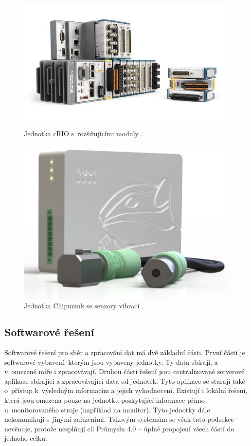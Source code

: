 \begin{figure}[h]
  \centering
  \begin{minipage}[b]{0.45\textwidth}
    \includegraphics[width=\textwidth]{obrazky-figures/rio.jpg}
    \caption{Jednotka cRIO s~rozšiřujícími moduly \cite{rio}.}
    \label{pic:rio}
  \end{minipage}
  \hfill
  \begin{minipage}[b]{0.45\textwidth}
    \includegraphics[width=\textwidth]{obrazky-figures/chipmunk.jpg}
    \caption{Jednotka Chipmunk se senzory vibrací \cite{4dotchipmunk}.}
    \label{pic:4dotchip}
  \end{minipage}
\end{figure}


\subsection{Softwarové řešení}
Softwarové řešení pro sběr a zpracování dat má dvě základní části. První částí je softwarové vybavení, kterým jsou vybaveny jednotky. Ty data sbírají, a v~omezené míře i zpracovávají. Druhou částí řešení jsou centralizované serverové aplikace sbírající a zpracovávající data od jednotek. Tyto aplikace se starají také o~přístup k~výsledným informacím a jejich vyhodnocení. 
Existují i lokální řešení, která jsou omezena pouze na jednotku poskytující informace přímo u~monitorovaného stroje (například na monitor). Tyto jednotky dále nekomunikují s~jinými zařízeními. Takovým systémům se však tato podsekce nevěnuje, protože nesplňují cíl Průmyslu 4.0 -- úplné propojení všech částí do jednoho celku.

